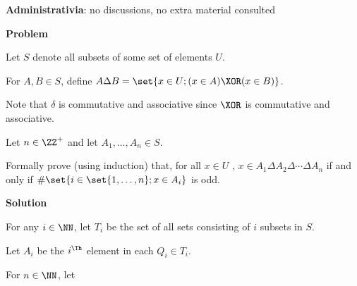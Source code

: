 \documentclass[11pt]{scrartcl}
\author{Alexander Illarionov}
\date{\today}
\title{}
\begin{document}
\textbf{Administrativia}: no discussions, no extra material consulted

\textbf{Problem}

Let \(S\) denote all subsets of some set of elements \(U\).

For \(A, B \in S\), define \(A \Delta B = \set{x \in U; (x \in A) \XOR (x \in B)}\).

Note that \(\delta\) is commutative and associative since \(\XOR\) is commutative and associative.

Let \(n \in \ZZ^+\) and let \(A_1, \dots , A_n \in S\).

Formally prove (using induction) that, for all \(x \in U\) , \(x \in A_1 \Delta A_2 \Delta \cdots \Delta A_n\) if and only if
\(\#\set{i \in \set{1, \dots , n}; x \in A_i }\) is odd.

\textbf{Solution}

For any \(i\in\NN\), let \(T_i\) be the set of all sets consisting of \(i\) subsets in \(S\).

Let \(A_i\) be the \(i^{\Th}\) element in each \(Q_{i}\in T_i\).

For \(n\in\NN\), let 
\end{document}
